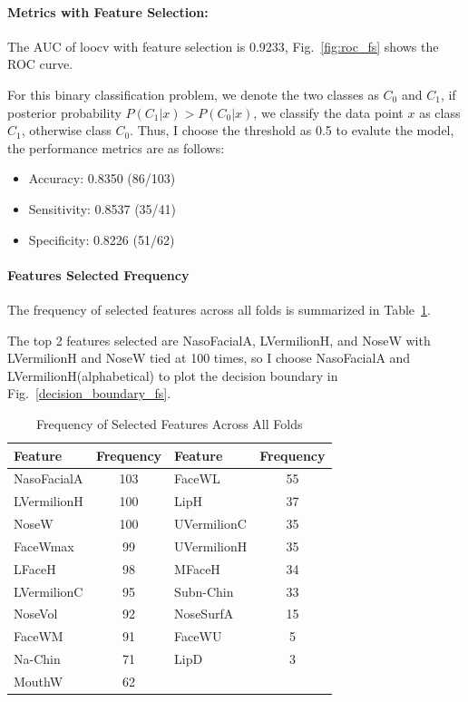 \documentclass[12pt,a4paper]{article}
\begin{document}
\paragraph{Metrics with Feature Selection: }

The AUC of loocv with feature selection is 0.9233, Fig.~\ref{fig:roc_fs} shows the ROC curve.

For this binary classification problem, we denote the two classes as $C_0$ and $C_1$, if posterior probability $P(C_1|x) > P(C_0|x)$, we classify the data point $x$ as class $C_1$, otherwise class $C_0$. Thus, I choose the threshold as 0.5 to evalute the model, the performance metrics are as follows:
\begin{itemize}
    \item Accuracy:    0.8350 (86/103)
    \item Sensitivity: 0.8537 (35/41)
    \item Specificity: 0.8226 (51/62)
\end{itemize}

\paragraph{Features Selected Frequency}
The frequency of selected features across all folds is summarized in Table~\ref{tab:feature_frequency}.

The top 2 features selected are NasoFacialA, LVermilionH, and NoseW with LVermilionH and NoseW tied at 100 times, so I choose NasoFacialA and LVermilionH(alphabetical) to plot the decision boundary in Fig.~\ref{decision_boundary_fs}.

\begin{table}[H]
    \centering
    \caption{Frequency of Selected Features Across All Folds}
    \label{tab:feature_frequency}
    \begin{tabular}{lclc}
        \toprule
        \textbf{Feature} & \textbf{Frequency} & \textbf{Feature} & \textbf{Frequency} \\
        \midrule
        NasoFacialA    & 103 & FaceWL         & 55  \\
        LVermilionH    & 100 & LipH           & 37  \\
        NoseW          & 100 & UVermilionC    & 35  \\
        FaceWmax       & 99  & UVermilionH    & 35  \\
        LFaceH         & 98  & MFaceH         & 34  \\
        LVermilionC    & 95  & Subn-Chin      & 33  \\
        NoseVol        & 92  & NoseSurfA      & 15  \\
        FaceWM         & 91  & FaceWU         & 5   \\
        Na-Chin        & 71  & LipD           & 3   \\
        MouthW         & 62  &                &     \\
        \bottomrule
    \end{tabular}
\end{table}
\end{document}
